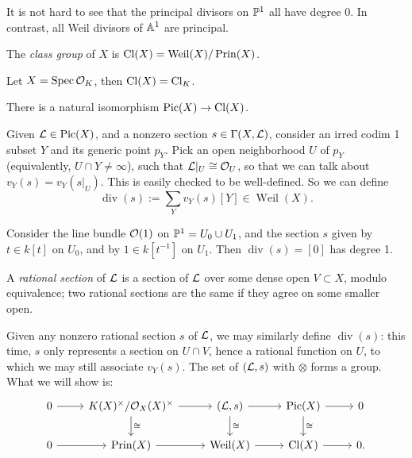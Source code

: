 \documentclass[11pt]{amsart}
\begin{document}
It is not hard to see that the principal divisors on $\PP^1$ all have degree 0. In contrast, all Weil divisors of $\AA^1$ are principal. 

\begin{defn}
    The \emph{class group} of $X$ is $\Cl(X) = \operatorname{Weil}(X)/\operatorname{Prin}(X)$.
\end{defn}

\begin{exm}
    Let $X = \Spec \cO_K$, then $\Cl(X) = \Cl_K$.
\end{exm}

\begin{thm}
\label{Pic=Cl}
    There is a natural isomorphism $\Pic(X)\to \Cl(X)$.
\end{thm}

Given $\cL\in \Pic(X)$, and a nonzero section $s\in \Gamma(X, \cL)$, consider an irred codim 1 subset $Y$ and its generic point $p_Y$. Pick an open neighborhood $U$ of $p_Y$ (equivalently, $U\cap Y \neq \infty$), such that $\cL|_U \cong \cO_U$, so that we can talk about $v_Y(s) = v_Y(s|_U)$. This is easily checked to be well-defined. So we can define
\[\operatorname{div}(s) := \sum_Y v_Y(s)[Y]\in \operatorname{Weil}(X).\]

\begin{exm}
    Consider the line bundle $\cO(1)$ on $\PP^1 = U_0\cup U_1$, and the section $s$ given by $t\in k[t]$ on $U_0$, and by $1\in k[t^{-1}]$ on $U_1$. Then $\operatorname{div}(s) = [0]$ has degree 1.
\end{exm}

\begin{defn}
    A \emph{rational section} of $\cL$ is a section of $\cL$ over some dense open $V\subset X$, modulo equivalence; two rational sections are the same if they agree on some smaller open.
\end{defn}

Given any nonzero rational section $s$ of $\cL$, we may similarly define $\operatorname{div}(s)$: this time, $s$ only represents a section on $U\cap V$, hence a rational function on $U$, to which we may still associate $v_Y(s)$. The set of $(\cL,s)$ with $\otimes$ forms a group. What we will show is:
\[
\begin{tikzcd}
    0 \arrow[r] & K(X)^\times/\cO_X(X)^\times \arrow[r] \arrow[d, "\cong"] & (\cL, s) \arrow[r] \arrow[d, "\cong"] & \Pic(X) \arrow[r] \arrow[d, "\cong"] & 0 \\
    0 \arrow[r] & \operatorname{Prin}(X) \arrow[r] & \operatorname{Weil}(X) \arrow[r] & \Cl(X) \arrow[r] & 0.
\end{tikzcd}
\]
\end{document}
